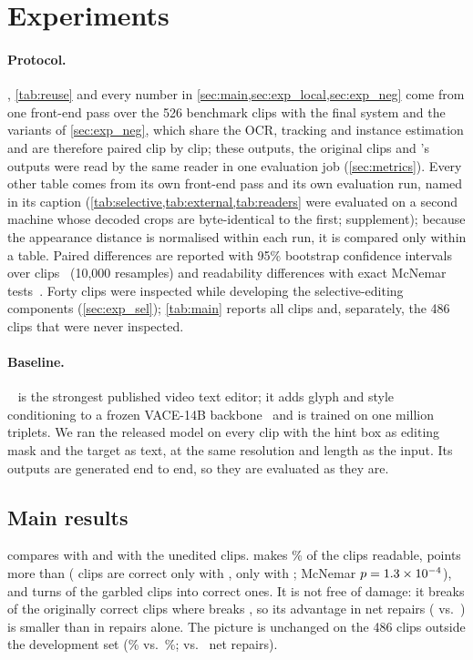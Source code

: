 \section{Experiments}
\label{sec:exp}

\paragraph{Protocol.} , \cref{tab:reuse} and every number in \cref{sec:main,sec:exp_local,sec:exp_neg} come from one front-end pass over the 526 benchmark clips with the final system and the variants of \cref{sec:exp_neg}, which share the OCR, tracking and instance estimation and are therefore paired clip by clip; these outputs, the original clips and \steer's outputs were read by the same reader in one evaluation job (\cref{sec:metrics}). Every other table comes from its own front-end pass and its own evaluation run, named in its caption (\cref{tab:selective,tab:external,tab:readers} were evaluated on a second machine whose decoded crops are byte-identical to the first; supplement); because the appearance distance is normalised within each run, it is compared only within a table. Paired differences are reported with 95\% bootstrap confidence intervals over clips~\cite{efron1994bootstrap} (10{,}000 resamples) and readability differences with exact McNemar tests~\cite{mcnemar1947}. Forty clips were inspected while developing the selective-editing components (\cref{sec:exp_sel}); \cref{tab:main} reports all clips and, separately, the 486 clips that were never inspected.

\paragraph{Baseline.} \steer~\cite{zeng2026steervte} is the strongest published video text editor; it adds glyph and style conditioning to a frozen VACE-14B backbone~\cite{jiang2025vace} and is trained on one million triplets. We ran the released model on every clip with the hint box as editing mask and the target as text, at the same resolution and length as the input. Its outputs are generated end to end, so they are evaluated as they are.



\subsection{Main results}
\label{sec:main}
 compares \method with \steer and with the unedited clips. \method makes \rOursRead\% of the clips readable, \rReadGain{} points more than \steer (\rOnlyOurs{} clips are correct only with \method, \rOnlySteer{} only with \steer; McNemar $p=1.3\times10^{-4}$), and turns \rOursFixed{} of the \rGarbled{} garbled clips into correct ones. It is not free of damage: it breaks \rOursBroken{} of the \rOrigCorrect{} originally correct clips where \steer breaks \rSteerBroken, so its advantage in net repairs (\rOursNet{} vs.\ \rSteerNet) is smaller than in repairs alone. The picture is unchanged on the 486 clips outside the development set (\rOursReadND\% vs.\ \rSteerReadND\%; \rOursNetND{} vs.\ \rSteerNetND{} net repairs).


